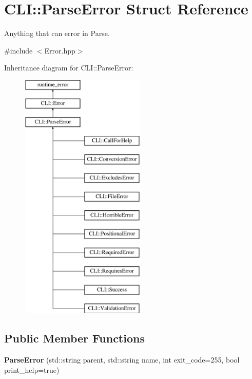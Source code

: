 \hypertarget{struct_c_l_i_1_1_parse_error}{}\section{C\+LI\+:\+:Parse\+Error Struct Reference}
\label{struct_c_l_i_1_1_parse_error}


Anything that can error in Parse.  




{\ttfamily \#include $<$Error.\+hpp$>$}

Inheritance diagram for C\+LI\+:\+:Parse\+Error\+:\begin{figure}[H]
\begin{center}
\leavevmode
\includegraphics[height=12.000000cm]{struct_c_l_i_1_1_parse_error}
\end{center}
\end{figure}
\subsection*{Public Member Functions}
\begin{DoxyCompactItemize}
\item 
\mbox{\label{struct_c_l_i_1_1_parse_error_ad7af7bf698b0fea17454b8cc27df19ab}} 
{\bfseries Parse\+Error} (std\+::string parent, std\+::string name, int exit\+\_\+code=255, bool print\+\_\+help=true)
\end{DoxyCompactItemize}
